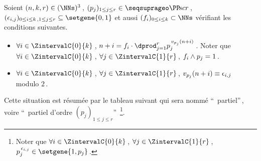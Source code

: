 \begin{defi}
	Soient $(n, k, r) \in ( \NNs )^3$\,,
	$( p_j )_{1 \leq j \leq r} \in \PPseq[r]$\,,
	$( \epsilon_{i,j} )_{0 \leq i \leq k \,, 1 \leq j \leq r} \subseteq \setgene{0, 1}$
	et aussi
	$( f_i )_{0 \leq i \leq k} \subset \NNs$
	vérifiant les conditions suivantes.
	\begin{itemize}
		\item $\forall i \in \ZintervalC{0}{k}$\,,
		$n + i = f_i \cdot \dprod_{j = 1}^{r} p_j^{\,\padicval[p_j]{n+i}}$\,.
		Noter que
		$\forall i \in \ZintervalC{0}{k}$\,,
		$\forall j \in \ZintervalC{1}{r}$\,,
		$f_i \wedge p_j = 1$\,.

		\item $\forall i \in \ZintervalC{0}{k}$\,,
		$\forall j \in \ZintervalC{1}{r}$\,,
		$\padicval[p_j]{n+i} \equiv \epsilon_{i,j}$ modulo $2$\,.
	\end{itemize}

	\smallskip

	Cette situation est résumée par le tableau suivant qui sera nommé \enquote{\sftab\ partiel}\,, voire \enquote{\sftab\ partiel d'ordre $( p_j )_{1 \leq j \leq r}$\!}\,
	\footnote{
		Noter que $\forall i \in \ZintervalC{0}{k}$\,, $\forall j \in \ZintervalC{1}{r}$\,, $p_j^{\,\epsilon_{i,j}} \in \setgene{1, p_j}$\,.
	}.

	\begin{center}
	\end{center}
\end{defi}




